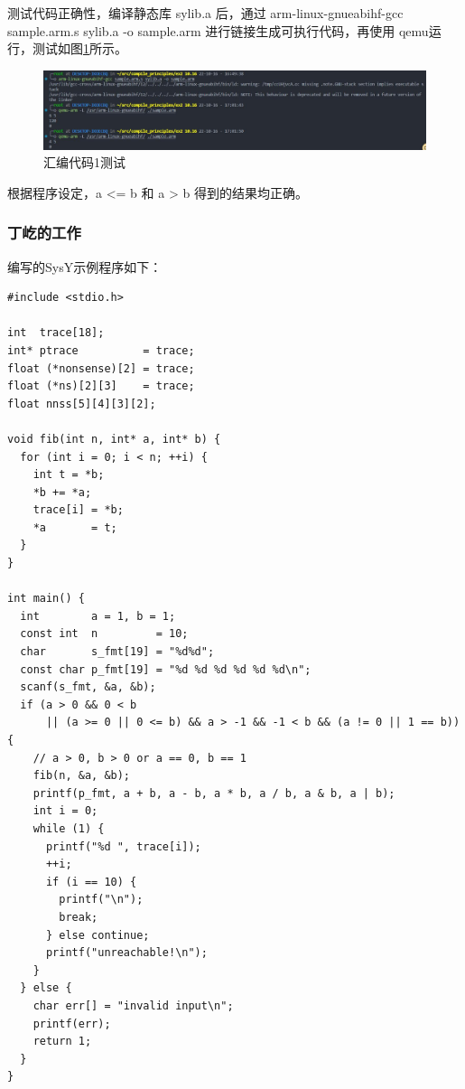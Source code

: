 \documentclass[UTF8,a4paper,10pt]{ctexart}
\begin{document}
测试代码正确性，编译静态库 sylib.a 后，通过 arm-linux-gnueabihf-gcc sample.arm.s sylib.a -o sample.arm 进行链接生成可执行代码，再使用 qemu运行，测试如图\ref{fig:1}所示。

\begin{figure}[H]
  \centering
  \includegraphics[width=1\textwidth]{figure/1.jpg}
  \caption{汇编代码1测试}
  \label{fig:1}
\end{figure}

根据程序设定，a <= b 和 a > b 得到的结果均正确。

\subsubsection{丁屹的工作}

编写的SysY示例程序如下：
\begin{verbatim}
#include <stdio.h>

int  trace[18];
int* ptrace          = trace;
float (*nonsense)[2] = trace;
float (*ns)[2][3]    = trace;
float nnss[5][4][3][2];

void fib(int n, int* a, int* b) {
  for (int i = 0; i < n; ++i) {
    int t = *b;
    *b += *a;
    trace[i] = *b;
    *a       = t;
  }
}

int main() {
  int        a = 1, b = 1;
  const int  n         = 10;
  char       s_fmt[19] = "%d%d";
  const char p_fmt[19] = "%d %d %d %d %d %d\n";
  scanf(s_fmt, &a, &b);
  if (a > 0 && 0 < b
      || (a >= 0 || 0 <= b) && a > -1 && -1 < b && (a != 0 || 1 == b)) {
    // a > 0, b > 0 or a == 0, b == 1
    fib(n, &a, &b);
    printf(p_fmt, a + b, a - b, a * b, a / b, a & b, a | b);
    int i = 0;
    while (1) {
      printf("%d ", trace[i]);
      ++i;
      if (i == 10) {
        printf("\n");
        break;
      } else continue;
      printf("unreachable!\n");
    }
  } else {
    char err[] = "invalid input\n";
    printf(err);
    return 1;
  }
}
\end{verbatim}
\end{document}
